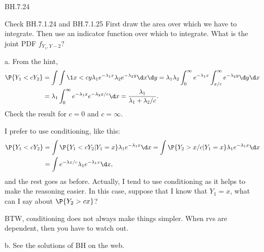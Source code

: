 
\setcounter{theorem}{23}
\begin{exercise}BH.7.24

\begin{hint}
Check BH.7.1.24 and BH.7.1.25
First draw the area over which we have to integrate. Then use an indicator function over which to integrate. What is the joint PDF  $f_{Y_1, Y-2}$?
\end{hint}
\begin{solution}
a. From the hint,
\begin{align*}
\P{Y_1<c Y_2}
  &= \int \int \1{x<c y}\lambda_1 e^{-\lambda_1 x} \lambda_2e^{-\lambda_2 y}\d x \d y
  = \lambda_1\lambda_2\int_0^{\infty} e^{-\lambda_{1}x}\int_{x/c}^{\infty} e^{-\lambda_{2} y}\d y \d x\\
  & = \lambda_1\int_0^{\infty} e^{-\lambda_{1}x} e^{-\lambda_{2} x/c} \d x
  = \frac{\lambda_1}{\lambda_1+\lambda_2/c}.
\end{align*}
Check the result for $c=0$ and $c=\infty$.

I prefer to use conditioning, like this:
\begin{align*}
\P{Y_1<c Y_2}
  &= \int \P{Y_1<cY_2| Y_1=x}\lambda_1 e^{-\lambda_1 x} \d x
  = \int \P{Y_2>x/c| Y_1=x}\lambda_1 e^{-\lambda_1 x} \d x\\
&= \int e^{-\lambda x/c} \lambda_1 e^{-\lambda_1 x} \d x,
\end{align*}
and the rest goes as before. Actually, I tend to use conditioning as it helps to make the reasoning easier. In this case, suppose that I know that $Y_1=x$, what can I say about $\P{Y_2 > c x}$?

BTW, conditioning does not always make things simpler. When rvs are dependent, then you have to watch out.

b. See the solutions of BH on the web.
\end{solution}
\end{exercise}

